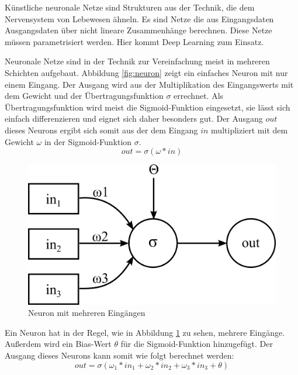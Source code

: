 Künstliche neuronale Netze sind Strukturen aus der Technik, die dem Nervensystem von Lebewesen ähneln. Es sind Netze die aus Eingangsdaten Ausgangsdaten über nicht lineare Zusammenhänge berechnen. Diese Netze müssen parametrisiert werden. Hier kommt Deep Learning zum Einsatz.

Neuronale Netze sind in der Technik zur Vereinfachung meist in mehreren Schichten aufgebaut. Abbildung \ref{fig:neuron} zeigt ein einfaches Neuron mit nur einem Eingang. Der Ausgang wird aus der Multiplikation des Eingangswerts mit dem Gewicht und der Übertragungsfunktion $\sigma$ errechnet. Als Übertragungsfunktion wird meist die Sigmoid-Funktion eingesetzt, sie lässt sich einfach differenzieren \citep{sigmoid} und eignet sich daher besonders gut. Der Ausgang $out$ dieses Neurons ergibt sich somit aus der dem Eingang $in$ multipliziert mit dem Gewicht $\omega$ in der Sigmoid-Funktion $\sigma$.
$$out = \sigma(\omega * in)$$

\begin{figure}
	\centering
	\includegraphics[scale=1]{images/neuron-multiple-inputs.png}
	\caption{Neuron mit mehreren Eingängen}
	\label{fig:neuron-multiple-inputs}
\end{figure}

Ein Neuron hat in der Regel, wie in Abbildung \ref{fig:neuron-multiple-inputs} zu sehen, mehrere Eingänge. Außerdem wird ein Bias-Wert $\theta$ für die Sigmoid-Funktion hinzugefügt. Der Ausgang dieses Neurons kann somit wie folgt berechnet werden:
$$out = \sigma(\omega_1*in_1 + \omega_2*in_2 + \omega_3*in_3 + \theta)$$


